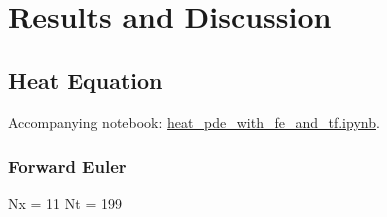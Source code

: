 \section{Results and Discussion}\label{sec:Results}

\subsection{Heat Equation}\label{sec:heateq results}
Accompanying notebook: \href{https://github.com/nicolossus/FYS-STK4155-Project3/blob/master/notebooks/heat_pde_with_fe_and_tf.ipynb}{heat\_pde\_with\_fe\_and\_tf.ipynb}.

\subsubsection{Forward Euler}
Nx = 11
Nt = 199

